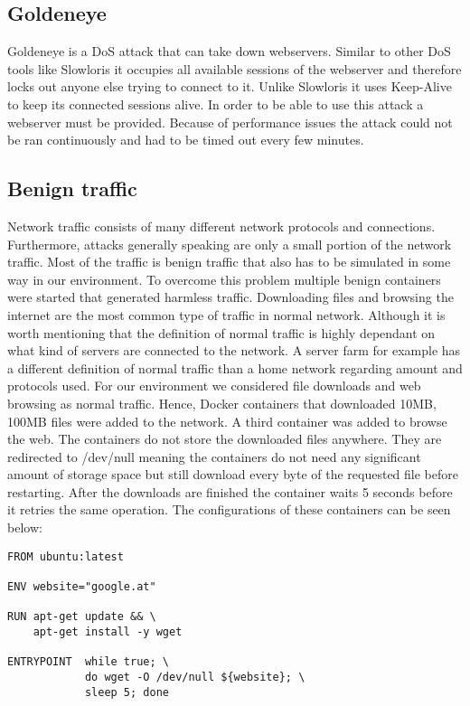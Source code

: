 \documentclass[conference]{IEEEtran}
\begin{document}
\subsection{Goldeneye}
Goldeneye is a DoS attack that can take down webservers. Similar to other DoS tools like Slowloris it occupies all available sessions of the webserver and therefore locks out anyone else trying to connect to it. Unlike Slowloris it uses Keep-Alive to keep its connected sessions alive. 
In order to be able to use this attack a webserver must be provided. Because of performance issues the attack could not be ran continuously and had to be timed out every few minutes. 

\subsection{Benign traffic}
Network traffic consists of many different network protocols and connections. Furthermore, attacks generally speaking are only a small portion of the network traffic. Most of the traffic is benign traffic that also has to be simulated in some way in our environment. To overcome this problem multiple benign containers were started that generated harmless traffic. Downloading files and browsing the internet are the most common type of traffic in normal network. Although it is worth mentioning that the definition of normal traffic is highly dependant on what kind of servers are connected to the network. A server farm for example has a different definition of normal traffic than a home network regarding amount and protocols used.
For our environment we considered file downloads and web browsing as normal traffic.
Hence, Docker containers that downloaded 10MB, 100MB files were added to the network. A third container was added to browse the web. The containers do not store the downloaded files anywhere. They are redirected to /dev/null meaning the containers do not need any significant amount of storage space but still download every byte of the requested file before restarting. After the downloads are finished the container waits 5 seconds before it retries the same operation. The configurations of these containers can be seen below:

\begin{lstlisting}[basicstyle=\footnotesize]
FROM ubuntu:latest

ENV website="google.at"

RUN apt-get update && \
    apt-get install -y wget
    
ENTRYPOINT  while true; \
            do wget -O /dev/null ${website}; \ 
            sleep 5; done
\end{lstlisting}
\end{document}
